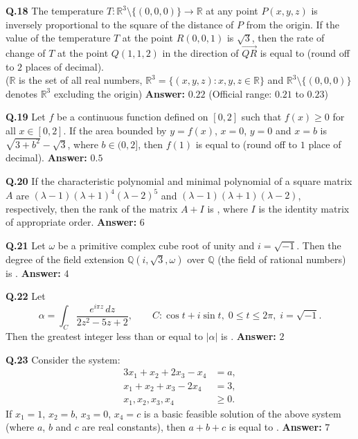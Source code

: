 \documentclass[11pt,a4paper]{article}
\newcommand{\ans}[1]{\textbf{Answer:} #1\par\medskip}
\begin{document}
\textbf{Q.18} The temperature $T : \mathbb{R}^3 \setminus \{(0, 0, 0)\} \to \mathbb{R}$ at any point $P(x, y, z)$ is inversely proportional to the square of the distance of $P$ from the origin. If the value of the temperature $T$ at the point $R(0, 0, 1)$ is $\sqrt{3}$, then the rate of change of $T$ at the point $Q(1, 1, 2)$ in the direction of $\overrightarrow{QR}$ is equal to \underline{\hspace{2cm}} (round off to $2$ places of decimal).\\
($\mathbb{R}$ is the set of all real numbers, $\mathbb{R}^3 = \{(x, y, z) : x, y, z \in \mathbb{R}\}$ and $\mathbb{R}^3 \setminus \{(0, 0, 0)\}$ denotes $\mathbb{R}^3$ excluding the origin)
\ans{$0.22$ (Official range: $0.21$ to $0.23$)}

\textbf{Q.19} Let $f$ be a continuous function defined on $[0, 2]$ such that $f(x) \ge 0$ for all $x \in [0, 2]$. If the area bounded by $y = f(x)$, $x = 0$, $y = 0$ and $x = b$ is $\sqrt{3 + b^2} - \sqrt{3}$, where $b \in (0, 2]$, then $f(1)$ is equal to \underline{\hspace{2cm}} (round off to $1$ place of decimal).
\ans{$0.5$}

\textbf{Q.20} If the characteristic polynomial and minimal polynomial of a square matrix $A$ are $(\lambda - 1)(\lambda + 1)^4 (\lambda - 2)^5$ and $(\lambda - 1)(\lambda + 1)(\lambda - 2)$, respectively, then the rank of the matrix $A + I$ is \underline{\hspace{2cm}}, where $I$ is the identity matrix of appropriate order.
\ans{$6$}

\textbf{Q.21} Let $\omega$ be a primitive complex cube root of unity and $i = \sqrt{-1}$. Then the degree of the field extension $\mathbb{Q}(i, \sqrt{3}, \omega)$ over $\mathbb{Q}$ (the field of rational numbers) is \underline{\hspace{2cm}}.
\ans{$4$}

\textbf{Q.22} Let
\[
  \alpha = \int_C \frac{e^{i\pi z}\,dz}{2z^2 - 5z + 2}, \qquad C : \cos t + i\sin t,\; 0 \le t \le 2\pi,\; i = \sqrt{-1}.
\]
Then the greatest integer less than or equal to $|\alpha|$ is \underline{\hspace{2cm}}.
\ans{$2$}

\textbf{Q.23} Consider the system:
\begin{align*}
  3x_1 + x_2 + 2x_3 - x_4 &= a, \\
  x_1 + x_2 + x_3 - 2x_4 &= 3, \\
  x_1, x_2, x_3, x_4 &\ge 0.
\end{align*}
If $x_1 = 1$, $x_2 = b$, $x_3 = 0$, $x_4 = c$ is a basic feasible solution of the above system (where $a$, $b$ and $c$ are real constants), then $a + b + c$ is equal to \underline{\hspace{2cm}}.
\ans{$7$}
\end{document}
